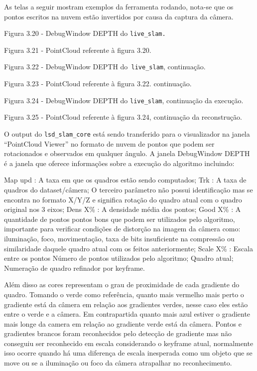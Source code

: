 As telas a seguir mostram exemplos da ferramenta rodando, nota-se que os pontos escritos na nuvem estão invertidos por causa da captura da câmera. 

Figura 3.20 - DebugWindow DEPTH do \texttt{live\_slam.}

Figura 3.21 - PointCloud referente à figura 3.20.


Figura 3.22 - DebugWindow DEPTH do\texttt{ live\_slam}, continuação.

Figura 3.23 - PointCloud referente à figura 3.22. continuação.

Figura 3.24 - DebugWindow DEPTH do \texttt{live\_slam}, continuação da execução.

Figura 3.25 - PointCloud referente à figura 3.24, continuação da reconstrução.

O output do \texttt{lsd\_slam\_core} está sendo transferido para o visualizador na janela “PointCloud Viewer” no formato de nuvem de pontos que podem ser rotacionados e observados em qualquer ângulo. A janela DebugWindow DEPTH é a janela que oferece informações sobre a execução do algoritmo incluindo:

Map upd : A taxa em que os quadros estão sendo computados;
Trk : A taxa de quadros do dataset/câmera;
O terceiro parâmetro não possui identificação mas se encontra no formato X/Y/Z e significa rotação do quadro atual com o quadro original nos 3 eixos;
Dens X\% : A densidade média dos pontos;
Good X\% : A quantidade de pontos pontos bons que podem ser utilizados pelo algoritmo, importante para verificar condições de distorção na imagem da câmera como: iluminação, foco, movimentação, taxa de bits insuficiente na compressão ou similaridade daquele quadro atual com os feitos anteriormente;
Scale X\% : Escala entre os pontos
Número de pontos utilizados pelo algoritmo;
Quadro atual;
Numeração de quadro refinador por keyframe.

Além disso as cores representam o grau de proximidade de cada gradiente do quadro. Tomando o verde como referência, quanto mais vermelho mais perto o gradiente está da câmera em relação aos gradientes verdes, nesse caso eles estão entre o verde e a câmera. Em contrapartida quanto mais azul estiver o gradiente mais longe da camera em relação ao gradiente verde está da câmera. Pontos e gradientes brancos foram reconhecidos pelo detecção de gradiente mas não conseguiu ser reconhecido em escala considerando o keyframe atual, normalmente isso ocorre quando há uma diferença de escala inesperada como um objeto que se move ou se a iluminação ou foco da câmera atrapalhar no reconhecimento.

